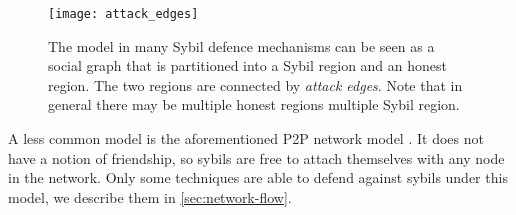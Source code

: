 \begin{figure}
  \centering
  \texttt{[image: attack\_edges]}
  \caption{The model in many Sybil defence mechanisms can be seen as a social
    graph that is partitioned into a Sybil region and an honest region. The two
    regions are connected by \emph{attack edges}. Note that in general there may
    be multiple honest regions multiple Sybil region. }
  \label{fig:attack-edge}
\end{figure}

A less common model is the aforementioned P2P network model \cite{douceur2002sybil}.
It does not have a notion of friendship, so sybils are free to attach themselves
with any node in the network. Only some techniques are able to defend against
sybils under this model, we describe them in \autoref{sec:network-flow}.

